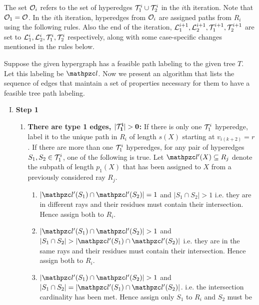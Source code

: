 The set ${\cal O}_i$ refers to the set of hyperedges ${\cal T}_1^i \cup {\cal T}_2^i$
in the $i$th iteration.  Note that ${\cal O}_1 = {\cal O}$.  In the $i$th
iteration, hyperedges from ${\cal O}_i$ are assigned paths from $R_i$ using
the following rules. Also the end of the iteration, ${\cal L}_1^{i+1},
{\cal L}_2^{i+1}, {\cal T}_1^{i+1}, {\cal T}_2^{i+1}$ are set to ${\cal L}_1^{i},
{\cal L}_2^{i}, {\cal T}_1^{i}, {\cal T}_2^{i}$ respectively, along with some
case-specific changes mentioned in the rules below.

\noindent
Suppose the given hypergraph has a feasible path labeling to the given
tree $T$. Let this labeling be $\cl$. Now we present an algorithm that
lists the sequence of edges that maintain a set of properties
necessary for them to have a feasible tree path labeling.
\begin{enumerate}[I.]
\item {\bf Step 1}
  \begin{enumerate}
  \item {\bf {There are type 1 edges, $\mathbf{|{\cal T}_1^i| > 0}$}:}
    {If there is only one ${\cal T}_1^i$ hyperedge, label it to the unique
      path in $R_i$ of length $s(X)$ starting at $v_{i(k+2)}=r$. If
      there are more than one ${\cal T}_1^i$ hyperedges, for any pair of
      hyperedges $S_1, S_2 \in {\cal T}_1^i$, one of the following is
      true. Let $\cl'(X) \subseteq R_j$ denote the subpath of length
      $p_1(X)$ that has been assigned to $X$ from a previously
      considered ray $R_j$.}
    \begin{enumerate}[{\em Case }1. ]
    \item $|\cl'(S_1) \cap \cl'(S_2)| = 1$ and $|S_1 \cap S_2| > 1$
      i.e. they are in different rays and their residues must contain
      their intersection. Hence assign both to $R_i$.
    \item $|\cl'(S_1) \cap \cl'(S_2)| > 1$ and $|S_1 \cap S_2| >
      |\cl'(S_1) \cap \cl'(S_2)|$ i.e. they are in the same rays and
      their residues must contain their intersection. Hence assign
      both to $R_i$.
    \item $|\cl'(S_1) \cap \cl'(S_2)| > 1$ and $|S_1 \cap S_2| =
      |\cl'(S_1) \cap \cl'(S_2)|$. i.e. the intersection cardinality
      has been met. Hence assign only $S_1$ to $R_i$ and $S_2$ must be

\end{enumerate}
\end{enumerate}
\end{enumerate}
